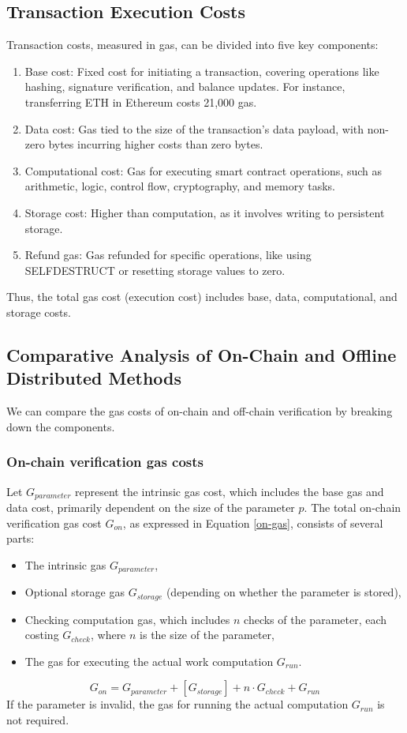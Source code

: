 \documentclass[runningheads]{llncs}
\begin{document}
\subsection{Transaction Execution Costs}
Transaction costs, measured in gas, can be divided into five key components:
\begin{enumerate}
\item Base cost: Fixed cost for initiating a transaction, covering operations like hashing, signature verification, and balance updates. For instance, transferring ETH in Ethereum costs 21,000 gas.
\item Data cost: Gas tied to the size of the transaction’s data payload, with non-zero bytes incurring higher costs than zero bytes.
\item Computational cost: Gas for executing smart contract operations, such as arithmetic, logic, control flow, cryptography, and memory tasks.
\item Storage cost: Higher than computation, as it involves writing to persistent storage. %
\item Refund gas: Gas refunded for specific operations, like using SELFDESTRUCT or resetting storage values to zero.
\end{enumerate}
Thus, the total gas cost (execution cost) includes base, data, computational, and storage costs.
\subsection{Comparative Analysis of On-Chain and Offline Distributed Methods}
We can compare the gas costs of on-chain and off-chain verification by breaking down the components.
\subsubsection{On-chain verification gas costs}
Let \( G_{parameter} \) represent the intrinsic gas cost, which includes the base gas and data cost, primarily dependent on the size of the parameter \( p \). The total on-chain verification gas cost \( G_{on} \), as expressed in Equation \ref{on-gas}, consists of several parts:
\begin{itemize}
    \item The intrinsic gas \( G_{parameter} \),
    \item Optional storage gas \( G_{storage} \) (depending on whether the parameter is stored),
    \item Checking computation gas, which includes \( n \) checks of the parameter, each costing \( G_{check} \), where \( n \) is the size of the parameter,
    \item The gas for executing the actual work computation \( G_{run} \).
\end{itemize}
\begin{equation}
\label{on-gas}
G_{on} = G_{parameter} + [G_{storage}] + n \cdot G_{check} + G_{run}
\end{equation}
If the parameter is invalid, the gas for running the actual computation \( G_{run} \) is not required.
\end{document}
